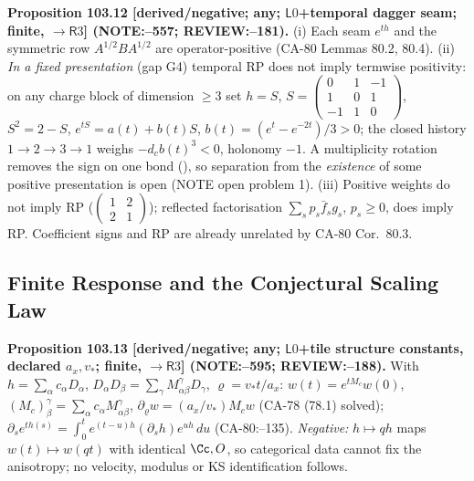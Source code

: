 \textbf{Proposition 103.12 [derived/negative; any; \(\mathsf L0\)+temporal dagger seam; finite, \(\to\mathsf R3\)] (NOTE:--557; REVIEW:--181).}
(i) Each seam \(e^{th}\) and the symmetric row \(A^{1/2}BA^{1/2}\) are operator-positive (CA-80 Lemmas 80.2, 80.4).
(ii) \emph{In a fixed presentation} (gap G4) temporal RP does not imply termwise positivity: on any charge block of dimension \(\ge3\) set
\(h=S\), \(S=\left(\begin{smallmatrix}0&1&-1\\1&0&1\\-1&1&0\end{smallmatrix}\right)\), \(S^2=2-S\), \(e^{tS}=a(t)+b(t)S\),
\(b(t)=(e^t-e^{-2t})/3>0\); the closed history \(1\to2\to3\to1\) weighs \(-d_cb(t)^3<0\), holonomy \(-1\).
A multiplicity rotation removes the sign on one bond (), so separation from the
\emph{existence} of some positive presentation is open (NOTE open problem 1).
(iii) Positive weights do not imply RP (\(\left(\begin{smallmatrix}1&2\\2&1\end{smallmatrix}\right)\)); reflected factorisation
\(\sum_sp_s\bar f_sg_s\), \(p_s\ge0\), does imply RP. Coefficient signs and RP are already unrelated by CA-80 Cor.~80.3.

\subsection{Finite Response and the Conjectural Scaling Law}

\textbf{Proposition 103.13 [derived/negative; any; \(\mathsf L0\)+tile structure constants, declared \(a_x,v_*\); finite, \(\to\mathsf R3\)] (NOTE:--595; REVIEW:--188).}\newline
With \(h=\sum_\alpha c_\alpha D_\alpha\), \(D_\alpha D_\beta=\sum_\gamma M^\gamma_{\alpha\beta}D_\gamma\), \(\varrho=v_*t/a_x\):
\(w(t)=e^{tM_c}w(0)\), \((M_c)^\gamma_\beta=\sum_\alpha c_\alpha M^\gamma_{\alpha\beta}\), \(\partial_\varrho w=(a_x/v_*)M_cw\) (CA-78 (78.1) solved);
\(\partial_se^{th(s)}=\int_0^te^{(t-u)h}(\partial_sh)e^{uh}\,du\) (CA-80:--135). \emph{Negative:} \(h\mapsto qh\) maps \(w(t)\mapsto w(qt)\) with
identical \(\Cc,O\), so categorical data cannot fix the anisotropy; no velocity, modulus or KS identification follows.

